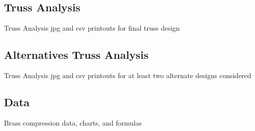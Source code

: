 \documentclass{article}
\let\Oldsubsection\subsection
\renewcommand{\subsection}{\FloatBarrier\Oldsubsection}
\begin{document}
\subsection{Truss Analysis}

Truss Analysis jpg and csv printouts for final truss design

\newpage

\subsection{Alternatives Truss Analysis}

Truss Analysis jpg and csv printouts for at least two alternate designs considered

\newpage

\subsection{Data}

Brass compression data, charts, and formulas

\newpage

\printbibliography
\end{document}
